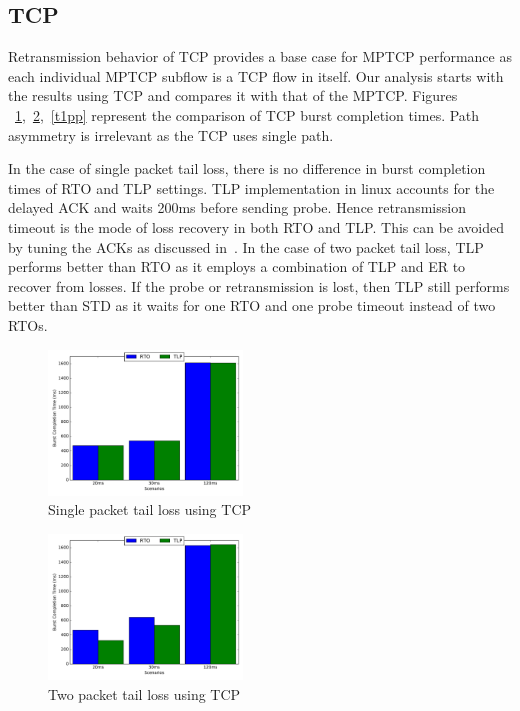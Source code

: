 \documentclass[10pt,draftcls,twocolumn]{IEEEconf}
\begin{document}
\subsection{TCP}
Retransmission behavior of TCP provides a base case for MPTCP performance as each individual MPTCP subflow is a TCP flow in itself. Our analysis
starts with the results using TCP and compares it with that of the MPTCP. Figures ~\ref{t1p},~\ref{t2p},~\ref{t1pp} represent the comparison of TCP 
burst completion times. Path asymmetry is irrelevant as the TCP uses single path.

In the case of single packet tail loss, there is no difference in burst completion times of RTO and TLP settings. TLP implementation in linux accounts
for the delayed ACK and waits 200ms before sending probe. Hence retransmission timeout is the mode of loss recovery in both RTO and TLP. This can be avoided by tuning
the ACKs as discussed in~\cite{Rajiullah:2015}.
In the case of two packet tail loss, TLP performs better than RTO as it employs a combination of TLP and ER to recover from losses. 
If the probe or retransmission is lost, then TLP still performs better than STD as it waits for one RTO and one probe timeout instead of two RTOs.

\begin{figure}[!ht]
\begin{center}
\includegraphics[angle=0, width=0.46\textwidth,natwidth=578.16,natheight=433.62]{plots/T1P.pdf}
\caption{Single packet tail loss using TCP}\label{t1p}
\end{center}
\end{figure}



\begin{figure}[!ht]
\begin{center}
\includegraphics[angle=0, width=0.46\textwidth,natwidth=578.16,natheight=433.62]{plots/T2P.pdf}
\caption{Two packet tail loss using TCP}\label{t2p}
\end{center}
\end{figure}
\end{document}

